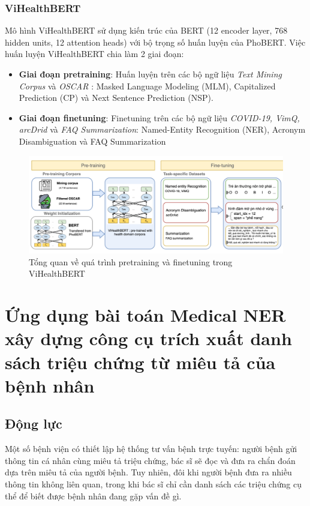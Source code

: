 \documentclass[12pt]{article}
\begin{document}
\subsubsection{ViHealthBERT}
Mô hình ViHealthBERT sử dụng kiến trúc của BERT (12 encoder layer, 768 hidden units, 12 attention heads) với bộ trọng số huấn luyện của PhoBERT. Việc huấn luyện ViHealthBERT chia làm 2 giai đoạn:
\begin{itemize}
\item \textbf{Giai đoạn pretraining}: Huấn luyện trên các bộ ngữ liệu \textit{Text Mining Corpus} và \textit{OSCAR} : Masked Language Modeling (MLM), Capitalized Prediction (CP) và Next Sentence Prediction (NSP).
\item \textbf{Giai đoạn finetuning}: Finetuning trên các bộ ngữ liệu \textit{COVID-19, VimQ, arcDrid} và \textit{FAQ Summarization}: Named-Entity Recognition (NER), Acronym Disambiguation và FAQ Summarization
\end{itemize}
\begin{figure}
\begin{center}
\includegraphics[scale=.8]{img/ViHealthBERT.png}
\caption{Tổng quan về quá trình pretraining và finetuning trong ViHealthBERT\cite{minh-EtAl:2022:LREC}}
\end{center}
\end{figure}

\section{Ứng dụng bài toán Medical NER xây dựng công cụ trích xuất danh sách triệu chứng từ miêu tả của bệnh nhân}
\subsection{Động lực}
Một số bệnh viện có thiết lập hệ thống tư vấn bệnh trực tuyến: người bệnh gửi thông tin cá nhân cùng miêu tả triệu chứng, bác sĩ sẽ đọc và đưa ra chẩn đoán dựa trên miêu tả của người bệnh. Tuy nhiên, đôi khi người bệnh đưa ra nhiều thông tin không liên quan, trong khi bác sĩ chỉ cần danh sách các triệu chứng cụ thể để biết được bệnh nhân đang gặp vấn đề gì.
\end{document}
